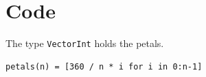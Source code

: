 \documentclass{article}
\begin{document}
\section{Code}
The type \texttt{Vector{Int}} holds the petals.

\begin{verbatim}
petals(n) = [360 / n * i for i in 0:n-1]
\end{verbatim}
\end{document}
